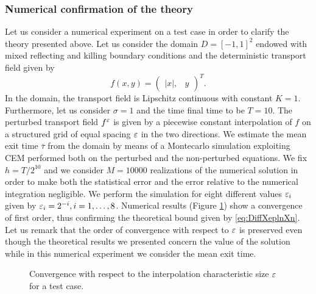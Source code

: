 \subsubsection{Numerical confirmation of the theory}

Let us consider a numerical experiment on a test case in order to clarify the theory presented above. Let us consider the domain $D = [-1, 1]^2$ endowed with mixed reflecting and killing boundary conditions and the deterministic transport field given by
\begin{equation*}
	f(x, y) = \begin{pmatrix} |x|, & y \end{pmatrix}^T.
\end{equation*}
In the domain, the transport field is Lipschitz continuous with constant $K = 1$. Furthermore, let us consider $\sigma = 1$ and the time final time to be $T = 10$. The perturbed transport field $f^\varepsilon$ is given by a piecewise constant interpolation of $f$ on a structured grid of equal spacing $\varepsilon$ in the two directions. We estimate the mean exit time $\bar\tau$ from the domain by means of a Montecarlo simulation exploiting CEM performed both on the perturbed and the non-perturbed equations. We fix $h = T / 2^{10}$ and we consider $M = 10000$ realizations of the numerical solution in order to make both the statistical error and the error relative to the numerical integration negligible. We perform the simulation for eight different values $\varepsilon_i$ given by $\varepsilon_i = 2^{-i}, i = 1,\dots, 8$. Numerical results (Figure \ref{fig:ConvTheory}) show a convergence of first order, thus confirming the theoretical bound given by \eqref{eq:DiffXeplnXn}. Let us remark that the order of convergence with respect to $\varepsilon$ is preserved even though the theoretical results we presented concern the value of the solution while in this numerical experiment we consider the mean exit time.

\begin{figure}[t]
    \centering
    \resizebox{0.6\linewidth}{!}{ }  
    \caption{Convergence with respect to the interpolation characteristic size $\varepsilon$ for a test case.}
    \label{fig:ConvTheory}
\end{figure}
